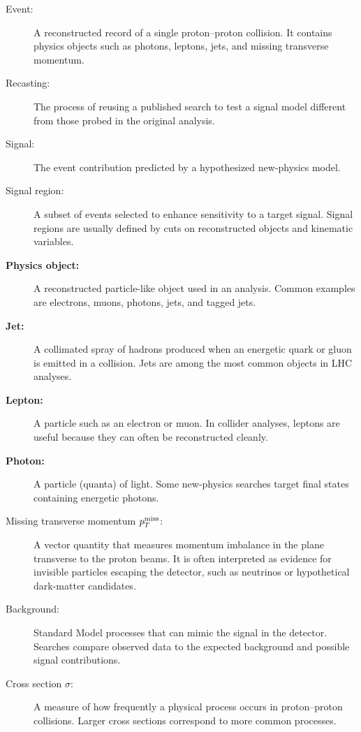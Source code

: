 \documentclass{article}
\begin{document}
\begin{description}
    \item [Event:] A reconstructed record of a single proton--proton collision. It contains physics objects such as photons, leptons, jets, and missing transverse momentum.

    \item[Recasting:]
    The process of reusing a published search to test a signal model different from those probed in the original analysis.

    \item[Signal:]
    The event contribution predicted by a hypothesized new-physics model.

    \item[Signal region:]
    A subset of events selected to enhance sensitivity to a target signal. Signal regions are usually defined by cuts on reconstructed objects and kinematic variables.

    \item[\bf Physics object:] A reconstructed particle-like object used in an analysis. Common examples are electrons, muons, photons, jets, and tagged jets.

    \item[\bf Jet:] A collimated spray of hadrons produced when an energetic quark or gluon is emitted in a collision. Jets are among the most common objects in LHC analyses.

    \item[\bf Lepton:]
    A particle such as an electron or muon. In collider analyses, leptons are useful because they can often be reconstructed cleanly.

    \item[\bf Photon:]
    A particle (quanta) of light. Some new-physics searches target final states containing energetic photons.

    \item[Missing transverse momentum $p_T^{\rm miss}$:]
    A vector quantity that measures momentum imbalance in the plane transverse to the proton beams. It is often interpreted as evidence for invisible particles escaping the detector, such as neutrinos or hypothetical dark-matter candidates.

    \item[Background:]
    Standard Model processes that can mimic the signal in the detector. Searches compare observed data to the expected background and possible signal contributions.

    \item[Cross section $\sigma$:]
    A measure of how frequently a physical process occurs in proton--proton collisions. Larger cross sections correspond to more common processes.


\end{description}
\end{document}
